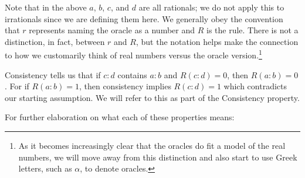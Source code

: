 \documentclass[12pt]{article}
\begin{document}
Note that in the above $a$, $b$, $c$, and $d$ are all rationals; we do not apply this to irrationals since we are defining them here. We generally obey the convention that $r$ represents naming the oracle as a number and $R$ is the rule. There is not a distinction, in fact, between $r$ and $R$, but the notation helps make the connection to how we customarily think of real numbers versus the oracle version.\footnote{As it becomes increasingly clear that the oracles do fit a model of the real numbers, we will move away from this distinction and also start to use Greek letters, such as $\alpha$, to denote oracles.}

Consistency tells us that if $c:d$ contains $a:b$ and $R(c:d) = 0$, then $R(a:b) = 0$. For if $R(a:b)=1$, then consistency implies $R(c:d)=1$ which contradicts our starting assumption. We will refer to this as part of the Consistency property. 

For further elaboration on what each of these properties means:
\end{document}
